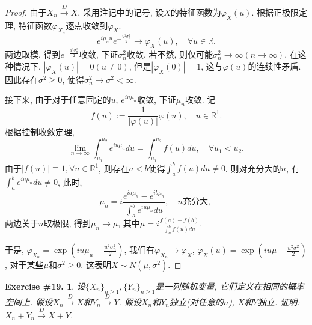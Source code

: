 \documentclass[UTF8, a4paper]{article}
\newtheorem{exercise}{Exercise \#19.}
\begin{document}
\begin{proof}
由于\(X_n \xrightarrow{D} X\), 采用注记中的记号, 设\(X\)的特征函数为\(\varphi_X(u) \).
根据正极限定理, 特征函数\(\varphi_{X_n}\)逐点收敛到\(\varphi_X\).
$$
e^{i\mu_n u} e^{-\frac{u^2 \sigma_n^2}{2}} \to \varphi_X(u), \quad \forall u \in \mathbb{R}.
$$
两边取模, 得到\(e^{-\frac{u^2 \sigma_n^2}{2}}\)收敛, 下证\(\sigma_n^2\)收敛.
若不然, 则仅可能\(\sigma_n^2 \to \infty(n \to \infty)\).
在这种情况下, \(|\varphi_X(u)| = 0(u\neq 0)\), 但是\(|\varphi_X(0)| = 1\), 这与\(\varphi(u)\)的连续性矛盾.
因此存在\(\sigma^2 \geq 0\), 使得\(\sigma_n^2 \to \sigma^2 < \infty\).

接下来, 由于对于任意固定的\(u\), \({e^{iu\mu_n}}\)收敛, 下证\(\mu_n\)收敛.
记
$$
f(u) := \frac{1}{|\varphi(u)|}\varphi(u), \quad u \in \mathbb{R}^1.
$$
根据控制收敛定理, 
$$
\lim_{n\to\infty}\int_{u_1}^{u_2}e^{iu\mu_n}du=\int_{u_1}^{u_2}f(u)du,\quad\forall u_1<u_2.
$$
由于\(|f(u)| \equiv 1, \forall u \in \mathbb{R}^1\), 则存在\(a<b\)使得\(\int_{a}^{b} f(u) du \neq 0\).
则对充分大的\(n\), 有\(\int_{a}^{b} e^{iu\mu_n} du \neq 0\), 此时, 
$$
\mu_n = i\frac{e^{ia\mu_n } - e^{ib\mu_n}}{\int_{a}^{b} e^{iu\mu_n} du}, \quad n\text{充分大, }
$$
两边关于\(n\)取极限, 得到\(\mu_n \to \mu\), 其中\(\mu = i\frac{f(a) - f(b)}{\int_{a}^{b} f(u) du}\). 

于是, \(\varphi_{X_n} = \exp\left(iu \mu_u - \frac{u^2 \sigma_n^2}{2}\right)\),
我们有\(\varphi_{X_n} \to \varphi_X\), \(\varphi_X(u) = \exp\left(iu \mu - \frac{u^2 \sigma^2}{2}\right)\), 对于某些\(\mu\)和\(\sigma^2 \geq 0\).
这表明\(X \sim N(\mu, \sigma^2)\).



\end{proof}



\begin{framed}
\begin{exercise}
设\(\{X_n\}_{n \geq 1}, \{Y_n\}_{n \geq 1}\)是一列随机变量, 它们定义在相同的概率空间上.
假设\(X_n \xrightarrow{D} X\)和\(Y_n \xrightarrow{D} Y\).
假设\(X_n\)和\(Y_n\)独立(对任意的\(n\)), \(X\)和\(Y\)独立.
证明: \(X_n + Y_n \xrightarrow{D} X + Y\).
\end{exercise}
\end{framed}
\end{document}
